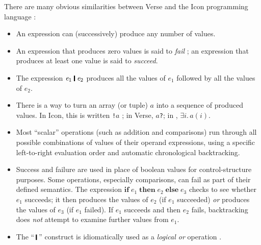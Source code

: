 \documentclass[acmsmall]{acmart}
\newcommand{\Varid}[1]{\mathit{#1}}
\begin{document}
There are many obvious similarities between Verse and the Icon programming language
\cite{griswold:icon-users-manual,griswold:generators-in-icon,griswold:icon-book-1983,griswold:icon-overview,griswold:icon-book-2002}:
\begin{itemize}
\item An expression can (successively) produce any number of values.
\item An expression that produces zero values is said to \emph{fail} \cite[\S 3.1]{griswold:generators-in-icon};
  an expression that produces at least one value is said to \emph{succeed}.
\item The expression \ensuremath{\Varid{e}_{\mathrm{1}}\;\rule[-0.1em]{0.15em}{0.75em}\;\Varid{e}_{\mathrm{2}}} produces all the values of \ensuremath{\Varid{e}_{\mathrm{1}}} followed by all the values of \ensuremath{\Varid{e}_{\mathrm{2}}}.
\item There is a way to turn an array (or tuple) $a$ into a sequence of produced values.
  In Icon, this is written \texttt{!\ensuremath{\Varid{a}}} \cite[\S 3]{griswold:icon-overview}; in Verse, \texttt{\ensuremath{\Varid{a}}?}; in \versecalc{}, \ensuremath{\exists\Varid{i}.\,\Varid{a}(\Varid{i})}.
\item Most ``scalar'' operations (such as addition and comparisons) run through
  all possible combinations of values of their operand expressions,
  using a specific left-to-right evaluation order and automatic chronological backtracking.
\item Success and failure are used in place of boolean values for control-structure purposes.
  Some operations, especially comparisons, can fail as part of their defined semantics.
  The expression \ensuremath{\textbf{if}\;\Varid{e}_{\mathrm{1}}\;\textbf{then}\;\Varid{e}_{\mathrm{2}}\;\textbf{else}\;\Varid{e}_{\mathrm{3}}} checks to see whether \ensuremath{\Varid{e}_{\mathrm{1}}} succeeds;
  it then produces the values of \ensuremath{\Varid{e}_{\mathrm{2}}} (if \ensuremath{\Varid{e}_{\mathrm{1}}} succeeded) \emph{or} produces the values of \ensuremath{\Varid{e}_{\mathrm{3}}} (if \ensuremath{\Varid{e}_{\mathrm{1}}} failed).
  If \ensuremath{\Varid{e}_{\mathrm{1}}} succeeds and then \ensuremath{\Varid{e}_{\mathrm{2}}} fails, backtracking does \emph{not} attempt to examine further values from \ensuremath{\Varid{e}_{\mathrm{1}}}.
\item The ``\ensuremath{\hspace{0.2em}\mathop{\rule[-0.1em]{0.15em}{0.75em}}\hspace{0.2em}}'' construct is idiomatically used as a \emph{logical or} operation \cite[\S 3]{griswold:icon-overview}.

\end{itemize}
\end{document}
